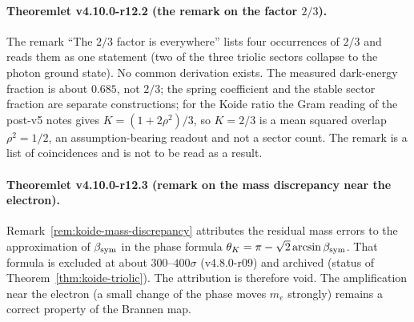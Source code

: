 \paragraph{Theoremlet v4.10.0-r12.2 (the remark on the factor \(2/3\)).}
The remark ``The \(2/3\) factor is everywhere'' lists four occurrences of \(2/3\) and reads them as one statement (two of the
three triolic sectors collapse to the photon ground state).  No common derivation exists.  The measured dark-energy fraction
is about \(0.685\), not \(2/3\); the spring coefficient and the stable sector fraction are separate constructions; for the Koide
ratio the Gram reading of the post-v5 notes gives \(K=(1+2\rho^2)/3\), so \(K=2/3\) is a mean squared overlap
\(\rho^2=1/2\), an assumption-bearing readout and not a sector count.  The remark is a list of coincidences and is not to be
read as a result.

\paragraph{Theoremlet v4.10.0-r12.3 (remark on the mass discrepancy near the electron).}
Remark~\ref{rem:koide-mass-discrepancy} attributes the residual mass errors to the approximation of \(\beta_{\rm sym}\) in the
phase formula \(\theta_K=\pi-\sqrt2\arcsin\beta_{\rm sym}\).  That formula is excluded at about \(300\)--\(400\sigma\)
(v4.8.0-r09) and archived (status of Theorem~\ref{thm:koide-triolic}).  The attribution is therefore void.  The amplification
near the electron (a small change of the phase moves \(m_e\) strongly) remains a correct property of the Brannen map.

